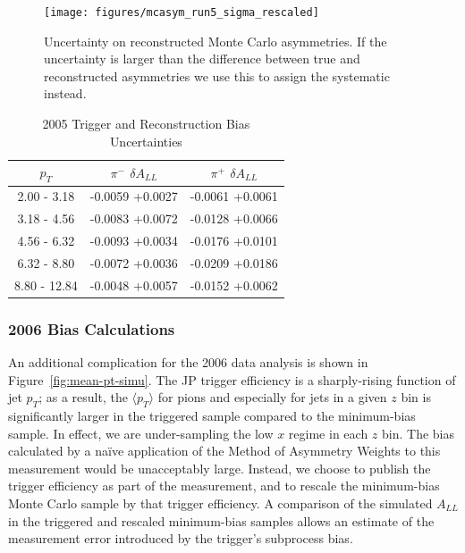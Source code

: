 \begin{figure}
  \texttt{[image: figures/mcasym\_run5\_sigma\_rescaled]}
  \caption{Uncertainty on reconstructed Monte Carlo asymmetries. If the
  uncertainty is larger than the difference between true and reconstructed
  asymmetries we use this to assign the systematic instead.}
  \label{fig:mcasym-sigma}
\end{figure}

\begin{table}[ht]
    \begin{center}
        \begin{tabular}{c|c|c}
        \hline
        $p_{T}$ & $\pi^{-}$ $\delta A_{LL}$ & $\pi^{+}$ $\delta A_{LL}$\\
        \hline
        2.00 - 3.18 & -0.0059 +0.0027 & -0.0061 +0.0061\\
        3.18 - 4.56 & -0.0083 +0.0072 & -0.0128 +0.0066\\
        4.56 - 6.32 & -0.0093 +0.0034 & -0.0176 +0.0101\\
        6.32 - 8.80 & -0.0072 +0.0036 & -0.0209 +0.0186\\
        8.80 - 12.84 & -0.0048 +0.0057 & -0.0152 +0.0062\\
    \hline
    \end{tabular}
    \end{center}
    \caption{2005 Trigger and Reconstruction Bias Uncertainties}
    \label{tbl:trig-reco-bias}
\end{table}

\subsubsection{2006 Bias Calculations}

An additional complication for the 2006 data analysis is shown in
Figure~\ref{fig:mean-pt-simu}. The JP trigger efficiency is a sharply-rising
function of jet \(p_T\); as a result, the \(\langle p_T \rangle\) for pions and
especially for jets in a given \(z\) bin is significantly larger in the
triggered sample compared to the minimum-bias sample. In effect, we are
under-sampling the low \(x\) regime in each \(z\) bin. The bias calculated by a
na\"ive application of the Method of Asymmetry Weights to this measurement would
be unacceptably large. Instead, we choose to publish the trigger efficiency as
part of the measurement, and to rescale the minimum-bias Monte Carlo sample by
that trigger efficiency. A comparison of the simulated \(A_{LL}\) in the
triggered and rescaled minimum-bias samples allows an estimate of the
measurement error introduced by the trigger's subprocess bias.

